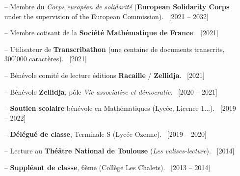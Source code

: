 \documentclass[10pt]{article}
\newcommand{\xfilll}[2][1ex]{
	\dimen0=#2\advance\dimen0 by #1
	\leaders\hrule height \dimen0 depth -#1\hfill}
\begin{document}
	
	
	\begin{itemize}[itemsep = -0.70 mm, leftmargin=*]
		\item[--] \noindent Membre du \textit{Corps européen de solidarité} (\textbf{European Solidarity Corps} under the supervision of the European Commission). \hfill {\ \small [2021 -- 2032]}
		\item[--] \noindent Membre cotisant de la \textbf{Société Mathématique de France}. \hfill {\ \small [2021]}
		\item[--] \noindent Utilisateur de \textbf{Transcribathon} (une centaine de documents transcrits, 300'000 caractères). \hfill {\ \small [2021]}
		\item[--] \noindent Bénévole comité de lecture éditions \textbf{Racaille} / \textbf{Zellidja}. \hfill {\ \small [2021]}
		\item[--] \noindent Bénévole \textbf{Zellidja}, pôle \textit{Vie associative et démocratie}. \hfill {\ \small [2020 -- 2021]}
		\item[--] \noindent \textbf{Soutien scolaire} bénévole en Mathématiques (Lycée, Licence 1...). \hfill {\ \small [2019 -- 2022]}
		\item[--] \noindent \textbf{Délégué de classe}, Terminale S (Lycée Ozenne). \hfill {\ \small [2019 -- 2020]}
		\item[--] \noindent Lecture au \textbf{Théâtre National de Toulouse} (\textit{Les valises-lecture}). \hfill {\ \small [2014]}
		\item[--] \noindent \textbf{Suppléant de classe}, 6ème (Collège Les Chalets). \hfill {\ \small [2013 -- 2014]}
	\end{itemize}	
	
	
	
	
	
	
	
	
\end{document}
